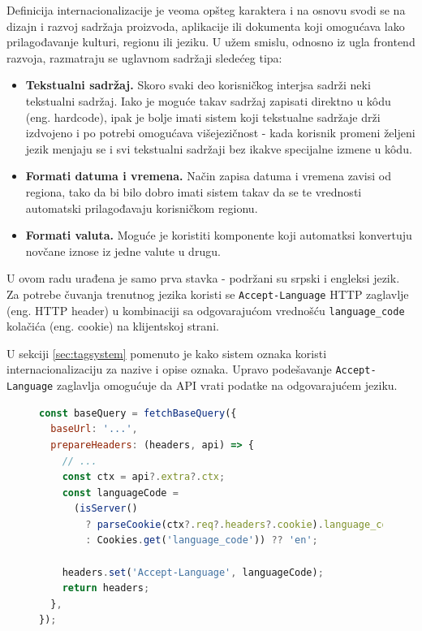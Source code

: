 \documentclass[12pt,oneside]{memoir}
\begin{document}
Definicija internacionalizacije je veoma opšteg karaktera i na osnovu \cite{i18n} svodi se na dizajn i razvoj sadržaja proizvoda, aplikacije ili dokumenta koji omogućava lako prilagođavanje kulturi, regionu ili jeziku. U užem smislu, odnosno iz ugla frontend razvoja, razmatraju se uglavnom sadržaji sledećeg tipa:

\begin{itemize}
    \item \textbf{Tekstualni sadržaj.} Skoro svaki deo korisničkog interjsa sadrži neki tekstualni sadržaj. Iako je moguće takav sadržaj zapisati direktno u k\^{o}du (eng. hardcode), ipak je bolje imati sistem koji tekstualne sadržaje drži izdvojeno i po potrebi omogućava višejezičnost - kada korisnik promeni željeni jezik menjaju se i svi tekstualni sadržaji bez ikakve specijalne izmene u k\^{o}du.
    \item \textbf{Formati datuma i vremena.} Način zapisa datuma i vremena zavisi od regiona, tako da bi bilo dobro imati sistem takav da se te vrednosti automatski prilagođavaju korisničkom regionu.
    \item \textbf{Formati valuta.} Moguće je koristiti komponente koji automatksi konvertuju novčane iznose iz jedne valute u drugu.
\end{itemize}



U ovom radu urađena je samo prva stavka - podržani su srpski i engleksi jezik. Za potrebe čuvanja trenutnog jezika koristi se \verb|Accept-Language| HTTP zaglavlje (eng. HTTP header) u kombinaciji sa odgovarajućom vrednošću \verb|language_code| kolačića (eng. cookie) na klijentskoj strani.

U sekciji \ref{sec:tagsystem} pomenuto je kako sistem oznaka koristi internacionalizaciju za nazive i opise oznaka. Upravo podešavanje \verb|Accept-Language| zaglavlja omogućuje da API vrati podatke na odgovarajućem jeziku.

\begin{figure}[h]
\begin{lstlisting}[language=JavaScript, style=ES6, caption={Postavljanje Accept-Language zaglavlja u RTKQ prilikom API zahteva.}]
const baseQuery = fetchBaseQuery({
  baseUrl: '...',
  prepareHeaders: (headers, api) => {
    // ...
    const ctx = api?.extra?.ctx;
    const languageCode =
      (isServer()
        ? parseCookie(ctx?.req?.headers?.cookie).language_code ?? ''
        : Cookies.get('language_code')) ?? 'en';

    headers.set('Accept-Language', languageCode);
    return headers;
  },
});
\end{lstlisting}
\end{figure}
\end{document}

